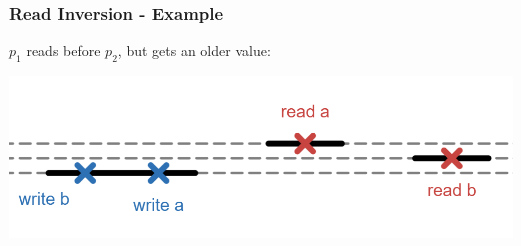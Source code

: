 \begin{frame}
    \frametitle{Read Inversion - Example}
    $p_1$ reads before $p_2$, but gets
    an older value:
    \begin{center}
        \includegraphics[scale=.6]{resources/read_inversion_lines.png}
    \end{center}
\end{frame}

